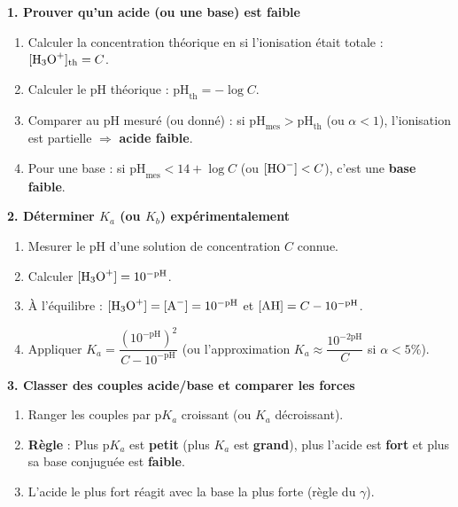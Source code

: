 \documentclass[11pt]{article}
\begin{document}
\begin{methode}
\textbf{1. Prouver qu'un acide (ou une base) est faible}
\begin{enumerate}
  \item Calculer la concentration théorique en  si l'ionisation était totale : $[\ce{H3O+}]_{\text{th}} = C$.
  \item Calculer le pH théorique : $\mathrm{pH}_{\text{th}} = -\log C$.
  \item Comparer au pH mesuré (ou donné) : si $\mathrm{pH}_{\text{mes}} > \mathrm{pH}_{\text{th}}$ (ou $\alpha < 1$), l'ionisation est partielle $\Rightarrow$ \textbf{acide faible}.
  \item Pour une base : si $\mathrm{pH}_{\text{mes}} < 14 + \log C$ (ou $[\ce{HO-}] < C$), c'est une \textbf{base faible}.
\end{enumerate}

\textbf{2. Déterminer $K_a$ (ou $K_b$) expérimentalement}
\begin{enumerate}
  \item Mesurer le pH d'une solution de concentration $C$ connue.
  \item Calculer $[\ce{H3O+}] = 10^{-\mathrm{pH}}$.
  \item À l'équilibre : $[\ce{H3O+}] = [\ce{A-}] = 10^{-\mathrm{pH}}$ et $[\ce{AH}] = C - 10^{-\mathrm{pH}}$.
  \item Appliquer $K_a = \dfrac{(10^{-\mathrm{pH}})^2}{C - 10^{-\mathrm{pH}}}$ (ou l'approximation $K_a \approx \dfrac{10^{-2\mathrm{pH}}}{C}$ si $\alpha < 5\%$).
\end{enumerate}

\textbf{3. Classer des couples acide/base et comparer les forces}
\begin{enumerate}
  \item Ranger les couples par $\mathrm{p}K_a$ croissant (ou $K_a$ décroissant).
  \item \textbf{Règle} : Plus $\mathrm{p}K_a$ est \textbf{petit} (plus $K_a$ est \textbf{grand}), plus l'acide  est \textbf{fort} et plus sa base conjuguée  est \textbf{faible}.
  \item L'acide le plus fort réagit avec la base la plus forte (règle du $\gamma$).
\end{enumerate}


\end{methode}
\end{document}
